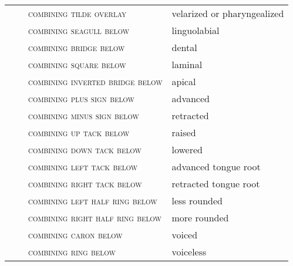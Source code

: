 \label{tab:ipa_diacritics}
 \tablelasttail{\bottomrule}

\begin{center}
\begin{xtabular}{ l L{1.1cm} L{6.2cm} L{3.6cm} }
 &  & \textsc{combining tilde overlay} & velarized or pharyngealized \\
 &  & \textsc{combining seagull below} & linguolabial \\
 &  & \textsc{combining bridge below} & dental \\
 &  & \textsc{combining square below} & laminal \\
 &  & \textsc{combining inverted bridge below} & apical \\
 &  & \textsc{combining plus sign below} & advanced \\
 &  & \textsc{combining minus sign below} & retracted \\
 &  & \textsc{combining up tack below} & raised \\
 &  & \textsc{combining down tack below} & lowered \\
 &  & \textsc{combining left tack below} & advanced tongue root \\
 &  & \textsc{combining right tack below} & retracted tongue root \\
 &  & \textsc{combining left half ring below} & less rounded \\
 &  & \textsc{combining right half ring below} & more rounded \\
 &  & \textsc{combining caron below} & voiced \\
 &  & \textsc{combining ring below} & voiceless \\

\end{xtabular}
\end{center}

